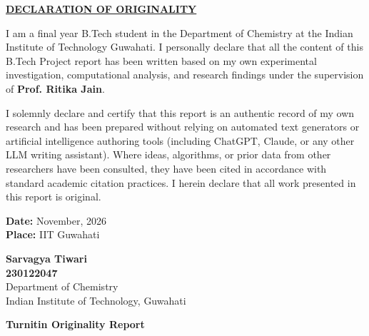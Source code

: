 \documentclass[12pt,a4paper,oneside]{report}
\begin{document}
\newpage

\thispagestyle{plain}
\begin{center}
    {\huge \textbf{\underline{DECLARATION OF ORIGINALITY}}}\\[1.2cm]
\end{center}

\noindent
\large
I am a final year B.Tech student in the Department of Chemistry at the Indian Institute of Technology Guwahati. I personally declare that all the content of this B.Tech Project report has been written based on my own experimental investigation, computational analysis, and research findings under the supervision of \textbf{Prof. Ritika Jain}. 

\vspace{0.45cm}
\noindent
I solemnly declare and certify that this report is an authentic record of my own research and has been prepared without relying on automated text generators or artificial intelligence authoring tools (including ChatGPT, Claude, or any other LLM writing assistant). Where ideas, algorithms, or prior data from other researchers have been consulted, they have been cited in accordance with standard academic citation practices. I herein declare that all work presented in this report is original.

\vspace{3.5cm}

\noindent
\begin{minipage}[t]{0.5\textwidth}
    \textbf{Date:} November, 2026\\
    \textbf{Place:} IIT Guwahati
\end{minipage}
\hfill
\begin{minipage}[t]{0.45\textwidth}
    \raggedleft
    \textbf{Sarvagya Tiwari}\\
    \textbf{230122047}\\
    Department of Chemistry\\
    Indian Institute of Technology, Guwahati
\end{minipage}

\normalsize
\newpage

\thispagestyle{plain}
\begin{center}
    {\huge \textbf{Turnitin Originality Report}}\\[0.8cm]
\end{center}
\end{document}
